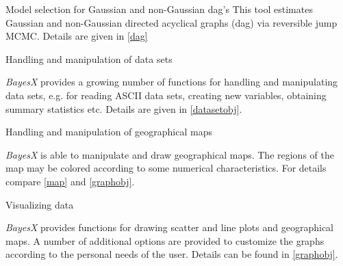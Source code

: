\newpage

\begin{stanza}{Model selection for Gaussian and non-Gaussian dag's}
This tool estimates Gaussian and non-Gaussian directed acyclical
graphs (dag) via reversible jump MCMC. Details are given in
\autoref{dag}
\end{stanza}

\begin{stanza}{Handling and manipulation of data sets}

{\em BayesX} provides a growing number of functions for handling
and manipulating data sets, e.g. for reading ASCII data sets,
creating new variables, obtaining summary statistics etc. Details
are given in \autoref{datasetobj}.
\end{stanza}

\begin{stanza}{Handling and manipulation of geographical maps}

{\em BayesX} is able to manipulate and draw geographical maps. The
regions of the map may be colored according to some numerical
characteristics. For details compare \autoref{map} and
\autoref{graphobj}.
\end{stanza}

\begin{stanza}{Visualizing data}

{\em BayesX} provides functions for drawing scatter and line plots
and geographical maps. A number of additional options are provided
to customize the graphs according to the personal needs of the
user. Details can be found in \autoref{graphobj}.
\end{stanza}

